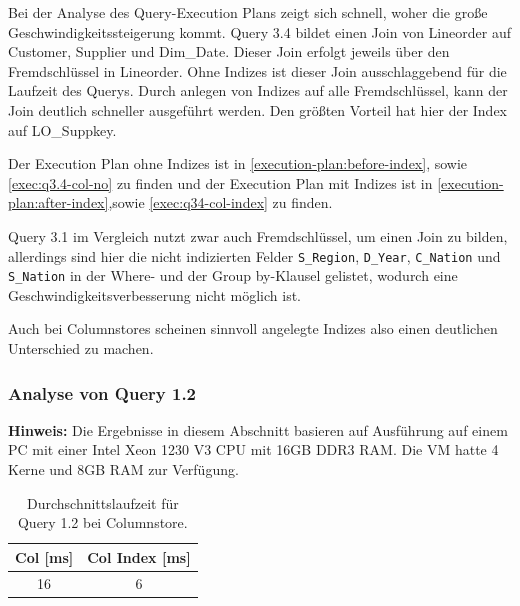 Bei der Analyse des Query-Execution Plans zeigt sich schnell,
woher die große Geschwindigkeitssteigerung kommt.
Query 3.4 bildet einen Join von Lineorder auf Customer,
Supplier und Dim\_Date. 
Dieser Join erfolgt jeweils über den Fremdschlüssel in Lineorder.
Ohne Indizes ist dieser Join ausschlaggebend für die Laufzeit des Querys.
Durch anlegen von Indizes auf alle Fremdschlüssel,
kann der Join deutlich schneller ausgeführt werden.
Den größten Vorteil hat hier der Index auf LO\_Suppkey.

Der Execution Plan ohne Indizes ist in \autoref{execution-plan:before-index}, sowie \autoref{exec:q3.4-col-no}
zu finden und der Execution Plan mit Indizes ist in \autoref{execution-plan:after-index},sowie \autoref{exec:q34-col-index} zu finden.

Query 3.1 im Vergleich nutzt zwar auch Fremdschlüssel, um einen Join zu bilden,
allerdings sind hier die nicht indizierten Felder \verb+S_Region+, \verb+D_Year+,
\verb+C_Nation+ und \verb+S_Nation+ in der Where- und der Group by-Klausel gelistet,
wodurch eine Geschwindigkeitsverbesserung nicht möglich ist.

Auch bei Columnstores scheinen sinnvoll angelegte Indizes also einen deutlichen Unterschied zu machen.

\subsubsection{Analyse von Query 1.2}
\textbf{Hinweis:} Die Ergebnisse in diesem Abschnitt basieren auf Ausführung auf einem PC mit einer Intel Xeon 1230 V3 CPU mit 16GB DDR3 RAM. Die VM hatte 4 Kerne und 8GB RAM zur Verfügung.






\setlength\intextsep{0pt}
\begin{table}
    \centering
    \begin{tabular}{cc}
        Col [ms]       & Col Index [ms]    \\
        \toprule
         16          & 6         \\   
    \end{tabular}
	\caption{Durchschnittslaufzeit für Query 1.2 bei Columnstore.}
    \label{tab:olap_q12}
\end{table}

